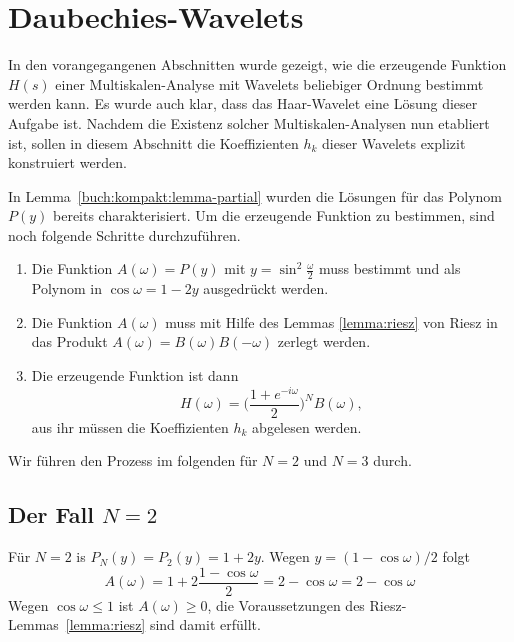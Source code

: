 %
%
%
\section{Daubechies-Wavelets\label{section:daubechies}}
In den vorangegangenen Abschnitten wurde gezeigt, wie die erzeugende
Funktion $H(s)$ einer Multiskalen-Analyse mit Wavelets beliebiger
Ordnung bestimmt werden kann.
Es wurde auch klar, dass das Haar-Wavelet eine Lösung dieser Aufgabe
ist.
Nachdem die Existenz solcher Multiskalen-Analysen nun etabliert ist,
sollen in diesem Abschnitt die Koeffizienten $h_k$ dieser Wavelets
explizit konstruiert werden.

In Lemma~\ref{buch:kompakt:lemma-partial} wurden die Lösungen für das
Polynom $P(y)$ bereits charakterisiert.
Um die erzeugende Funktion zu bestimmen, sind noch folgende Schritte
durchzuführen.
\begin{enumerate}
\item
Die Funktion $A(\omega)=P(y)$ mit $y=\sin^2\frac{\omega}2$ muss
bestimmt und als Polynom in $\cos\omega=1-2y$ ausgedrückt werden.
\item
Die Funktion $A(\omega)$ muss mit Hilfe des Lemmas \ref{lemma:riesz}
von Riesz in das Produkt $A(\omega)=B(\omega)B(-\omega)$ zerlegt
werden.
\item
Die erzeugende Funktion ist dann
\[
H(\omega)
=
\biggl(
\frac{1+e^{-i\omega}}2
\biggr)^N
B(\omega),
\]
aus ihr müssen die Koeffizienten $h_k$ abgelesen werden.
\end{enumerate}

Wir führen den Prozess im folgenden für $N=2$ und $N=3$ durch.

\subsection{Der Fall $N=2$}
Für $N=2$ is $P_N(y)=P_2(y)=1+2y$.
Wegen $y=(1-\cos \omega)/2$ folgt
\[
A(\omega) = 1 + 2\frac{1-\cos\omega}2 = 2-\cos\omega
= 2- \cos\omega
\]
Wegen $\cos\omega\le 1$ ist $A(\omega) \ge 0$, die Voraussetzungen des
Riesz-Lemmas~\ref{lemma:riesz} sind damit erfüllt.

